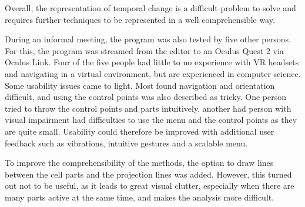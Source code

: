 Overall, the representation of temporal change is a difficult problem to solve and requires further techniques to be represented in a well comprehensible way.

During an informal meeting, the program was also tested by five other persons. For this, the program was streamed from the editor to an Oculus Quest 2 via Oculus Link. Four of the five people had little to no experience with VR headsets and navigating in a virtual environment, but are experienced in computer science. Some usability issues came to light. Most found navigation and orientation difficult, and using the control points was also described as tricky. One person tried to throw the control points and parts intuitively, another had person with visual impairment had difficulties to use the menu and the control points as they are quite small. Usability could therefore be improved with additional user feedback such as vibrations, intuitive gestures and a scalable menu.

To improve the comprehensibility of the methods, the option to draw lines between the cell parts and the projection lines was added. However, this turned out not to be useful, as it leads to great visual clutter, especially when there are many parts active at the same time, and makes the analysis more difficult.

